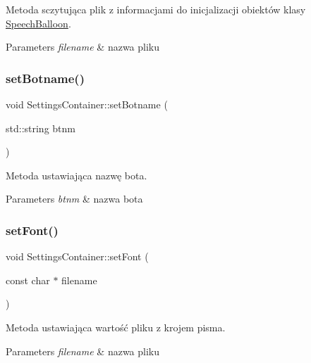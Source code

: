 Metoda sczytująca plik z informacjami do inicjalizacji obiektów klasy \mbox{\hyperlink{class_speech_balloon}{Speech\+Balloon}}. 


\begin{DoxyParams}{Parameters}
{\em filename} & nazwa pliku \\
\hline
\end{DoxyParams}
\mbox{\label{class_settings_container_a0863865f0c29a22cb94786a9d06ab8e5}} 
\subsubsection{\texorpdfstring{setBotname()}{setBotname()}}
{\footnotesize\ttfamily void Settings\+Container\+::set\+Botname (\begin{DoxyParamCaption}\item[{std\+::string}]{btnm }\end{DoxyParamCaption})\hspace{0.3cm}{\ttfamily [inline]}}



Metoda ustawiająca nazwę bota. 


\begin{DoxyParams}{Parameters}
{\em btnm} & nazwa bota \\
\hline
\end{DoxyParams}
\mbox{\label{class_settings_container_aea46f6b09eac8277d8dc937206161d6d}} 
\subsubsection{\texorpdfstring{setFont()}{setFont()}}
{\footnotesize\ttfamily void Settings\+Container\+::set\+Font (\begin{DoxyParamCaption}\item[{const char $\ast$}]{filename }\end{DoxyParamCaption})}



Metoda ustawiająca wartość pliku z krojem pisma. 


\begin{DoxyParams}{Parameters}
{\em filename} & nazwa pliku \\
\hline
\end{DoxyParams}
\mbox{\label{class_settings_container_ad8aa4d6394970991b60aedfa536519a6}} 
